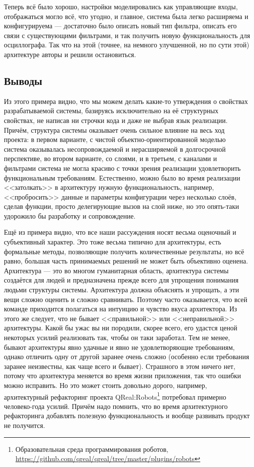 \documentclass[a5paper]{article}
\begin{document}
Теперь всё было хорошо, настройки моделировались как управляющие входы, отображаться могло всё, что угодно, и главное, система была легко расширяема и конфигурируема --- достаточно было описать новый тип фильтра, описать его связи с существующими фильтрами, и так получить новую функциональность для осциллографа. Так что на этой (точнее, на немного улучшенной, но по сути этой) архитектуре авторы и решили остановиться.

\subsection{Выводы}

Из этого примера видно, что мы можем делать какие-то утверждения о свойствах разрабатываемой системы, базируясь исключительно на её структурных свойствах, не написав ни строчки кода и даже не выбрав язык реализации. Причём, структура системы оказывает очень сильное влияние на весь ход проекта: в первом варианте, с чистой объектно-ориентированной моделью система оказывалась несопровождаемой и нерасширяемой в долгосрочной перспективе, во втором варианте, со слоями, и в третьем, с каналами и фильтрами система не могла красиво с точки зрения реализации удовлетворить функциональным требованиям. Естественно, можно было во время реализации <<затолкать>> в архитектуру нужную функциональность, например, <<пробросить>> данные и параметры конфигурации через несколько слоёв, сделав функции, просто делегирующие вызов на слой ниже, но это опять-таки удорожило бы разработку и сопровождение.

Ещё из примера видно, что все наши рассуждения носят весьма оценочный и субъективный характер. Это тоже весьма типично для архитектуры, есть формальные методы, позволяющие получить количественные результаты, но всё равно, большая часть принимаемых решений не может быть объективно оценена. Архитектура --- это во многом гуманитарная область, архитектура системы создаётся для людей и предназначена прежде всего для упрощения понимания людьми структуры системы. Архитектура должна объяснять и упрощать, а эти вещи сложно оценить и сложно сравнивать. Поэтому часто оказывается, что всей команде приходится полагаться на интуицию и чувство вкуса архитектора. Из этого же следует, что не бывает <<правильной>> или <<неправильной>> архитектуры. Какой бы ужас вы ни породили, скорее всего, его удастся ценой некоторых усилий реализовать так, чтобы он таки заработал. Тем не менее, бывают архитектуры явно удачные и явно не удовлетворяющие требованиям, однако отличить одну от другой заранее очень сложно (особенно если требования заранее неизвестны, как чаще всего и бывает). Страшного в этом ничего нет, потому что архитектура меняется во время жизни приложения, так что ошибки можно исправить. Но это может стоить довольно дорого, например, архитектурный рефакторинг проекта QReal:Robots\footnote{Образовательная среда программирования роботов, \url{https://github.com/qreal/qreal/tree/master/plugins/robots}} потребовал примерно человеко-года усилий. Причём надо помнить, что во время архитектурного рефакторинга добавлять полезную функциональность и вообще развивать продукт не получится.
\end{document}
